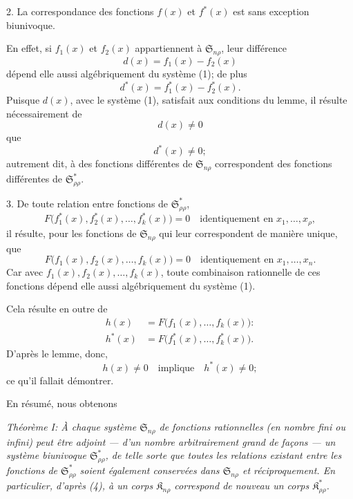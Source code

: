 \documentclass[11pt]{article}
\providecommand{\Kfield}{\mathfrak{K}}
\providecommand{\Ssys}{\mathfrak{S}}
\begin{document}
2. La correspondance des fonctions $f(x)$ et $f^*(x)$ est sans exception biunivoque.

En effet, si $f_1(x)$ et $f_2(x)$ appartiennent à $\Ssys_{n\rho}$, leur différence
\[
  d(x)=f_1(x)-f_2(x)
\]
dépend elle aussi algébriquement du système (1); de plus
\[
  d^*(x)=f_1^*(x)-f_2^*(x).
\]
Puisque $d(x)$, avec le système (1), satisfait aux conditions du lemme, il résulte nécessairement de
\[
  d(x)\ne0
\]
que
\[
  d^*(x)\ne0;
\]
autrement dit, à des fonctions différentes de $\Ssys_{n\rho}$ correspondent des fonctions différentes de $\Ssys^*_{\rho\rho}$.

3. De toute relation entre fonctions de $\Ssys^*_{\rho\rho}$,
\[
  F\bigl(f_1^*(x),f_2^*(x),\ldots,f_k^*(x)\bigr)=0
  \quad\text{identiquement en }x_1,\ldots,x_\rho,
\]
il résulte, pour les fonctions de $\Ssys_{n\rho}$ qui leur correspondent de manière unique, que
\[
  F\bigl(f_1(x),f_2(x),\ldots,f_k(x)\bigr)=0
  \quad\text{identiquement en }x_1,\ldots,x_n.
\]
Car avec $f_1(x),f_2(x),\ldots,f_k(x)$, toute combinaison rationnelle de ces fonctions dépend elle aussi algébriquement du système (1).

Cela résulte en outre de
\begin{equation}
\begin{aligned}
 h(x)&=F\bigl(f_1(x),\ldots,f_k(x)\bigr):\\
 h^*(x)&=F\bigl(f_1^*(x),\ldots,f_k^*(x)\bigr).
\end{aligned}
\tag{4}
\end{equation}
D'après le lemme, donc,
\[
  h(x)\ne0\quad\text{implique}\quad h^*(x)\ne0;
\]
ce qu'il fallait démontrer.

En résumé, nous obtenons

\emph{Théorème I: À chaque système $\Ssys_{n\rho}$ de fonctions rationnelles (en nombre fini ou infini) peut être adjoint --- d'un nombre arbitrairement grand de façons --- un système biunivoque $\Ssys^*_{\rho\rho}$, de telle sorte que toutes les relations existant entre les fonctions de $\Ssys^*_{\rho\rho}$ soient également conservées dans $\Ssys_{n\rho}$ et réciproquement. En particulier, d'après (4), à un corps $\Kfield_{n\rho}$ correspond de nouveau un corps $\Kfield^*_{\rho\rho}$.}
\end{document}
